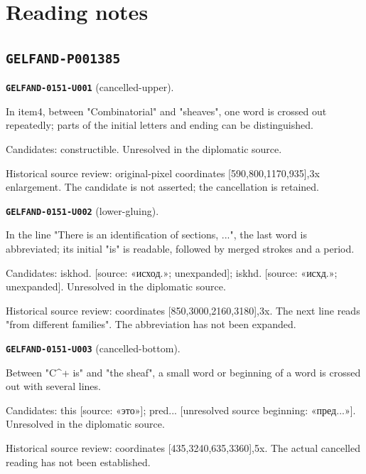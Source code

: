 \section*{Reading notes}
\subsection*{\texttt{GELFAND-P001385}}
\par\noindent\leavevmode{}\label{GELFAND-0151-U001}\textbf{\texttt{GELFAND-0151-U001}} (cancelled-upper).\nopagebreak[4]\par
In item4, between "Combinatorial" and "sheaves", one word is crossed out repeatedly; parts of the initial letters and ending can be distinguished.\par
Candidates: constructible. Unresolved in the diplomatic source.\par
Historical source review: original-pixel coordinates [590,800,1170,935],3x enlargement. The candidate is not asserted; the cancellation is retained.\par
\medskip
\par\noindent\leavevmode{}\label{GELFAND-0151-U002}\textbf{\texttt{GELFAND-0151-U002}} (lower-gluing).\nopagebreak[4]\par
In the line "There is an identification of sections, ...", the last word is abbreviated; its initial "is" is readable, followed by merged strokes and a period.\par
Candidates: iskhod. [source: «исход.»; unexpanded]; iskhd. [source: «исхд.»; unexpanded]. Unresolved in the diplomatic source.\par
Historical source review: coordinates [850,3000,2160,3180],3x. The next line reads "from different families". The abbreviation has not been expanded.\par
\medskip
\par\noindent\leavevmode{}\label{GELFAND-0151-U003}\textbf{\texttt{GELFAND-0151-U003}} (cancelled-bottom).\nopagebreak[4]\par
Between "C\textasciicircum{}+ is" and "the sheaf", a small word or beginning of a word is crossed out with several lines.\par
Candidates: this [source: «это»]; pred... [unresolved source beginning: «пред...»]. Unresolved in the diplomatic source.\par
Historical source review: coordinates [435,3240,635,3360],5x. The actual cancelled reading has not been established.\par
\medskip
